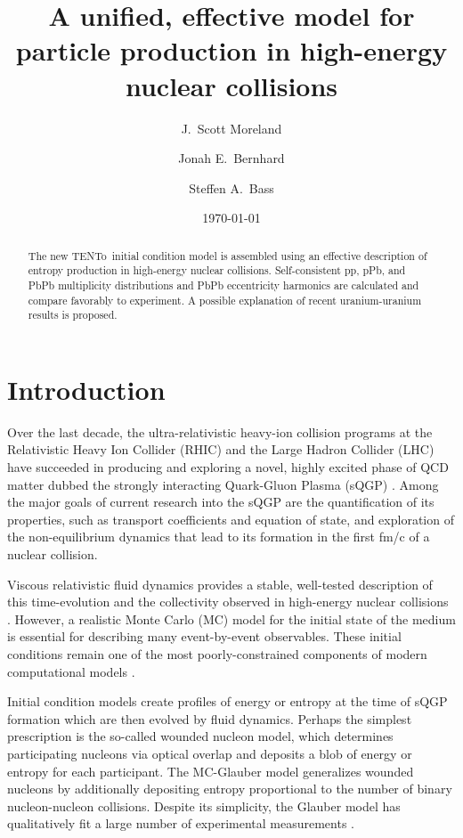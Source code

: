 \documentclass[aps,prl,reprint,amsmath,nofootinbib]{revtex4-1}
\newcommand{\trento}{T\raisebox{-.5ex}{R}ENTo}
\begin{document}
\title{A unified, effective model for particle production in high-energy nuclear collisions}

\author{J.\ Scott Moreland}
\author{Jonah E.\ Bernhard}
\author{Steffen A.\ Bass}

\date{\today}


\begin{abstract}
  The new \trento\ initial condition model is assembled using an effective description of entropy production
  in high-energy nuclear collisions.  Self-consistent pp, pPb, and PbPb multiplicity distributions and PbPb
  eccentricity harmonics are calculated and compare favorably to experiment.  A possible explanation of recent
  uranium-uranium results is proposed.
\end{abstract}


\maketitle

\section{Introduction}

Over the last decade, the ultra-relativistic heavy-ion collision programs at the Relativistic Heavy Ion Collider (RHIC) and the Large Hadron Collider 
(LHC) have succeeded in producing and exploring a novel, highly excited phase of QCD matter dubbed the strongly interacting Quark-Gluon Plasma (sQGP) 
\cite{Arsene:2004fa,Adcox:2004mh,Back:2004je,Adams:2005dq,Gyulassy:2004zy,Muller:2006ee,Muller:2012zq}. Among the major goals of current research into 
the sQGP are the quantification of its properties, such as transport coefficients and equation of state, and exploration of the non-equilibrium dynamics 
that lead to its formation in the first fm/c of a nuclear collision. 

Viscous relativistic fluid dynamics provides 
a stable, well-tested description of this time-evolution and the collectivity observed in high-energy nuclear collisions \cite{}.  However, a 
realistic Monte Carlo (MC) model for the initial state of the medium is essential for describing many event-by-event observables.  These initial 
conditions remain one of the most poorly-constrained components of modern computational models \cite{}.

Initial condition models create profiles of energy or entropy at the time of sQGP formation which are then evolved by
fluid dynamics.  Perhaps the simplest prescription is the so-called wounded nucleon model, which determines
participating nucleons via optical overlap and deposits a blob of energy or entropy for each participant.  The
MC-Glauber model generalizes wounded nucleons by additionally depositing entropy proportional to the number of
binary nucleon-nucleon collisions.  Despite its simplicity, the Glauber model has qualitatively fit a large number 
of experimental measurements \cite{}.
\end{document}

